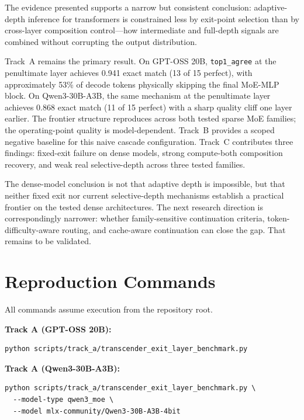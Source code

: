 \documentclass[11pt]{article}
\begin{document}
The evidence presented supports a narrow but consistent conclusion: adaptive-depth inference for transformers is constrained less by exit-point selection than by cross-layer composition control---how intermediate and full-depth signals are combined without corrupting the output distribution.

Track~A remains the primary result. On GPT-OSS 20B, \texttt{top1\_agree} at the penultimate layer achieves 0.941 exact match (13 of 15 perfect), with approximately 53\% of decode tokens physically skipping the final MoE-MLP block. On Qwen3-30B-A3B, the same mechanism at the penultimate layer achieves 0.868 exact match (11 of 15 perfect) with a sharp quality cliff one layer earlier. The frontier structure reproduces across both tested sparse MoE families; the operating-point quality is model-dependent. Track~B provides a scoped negative baseline for this naive cascade configuration. Track~C contributes three findings: fixed-exit failure on dense models, strong compute-both composition recovery, and weak real selective-depth across three tested families.

The dense-model conclusion is not that adaptive depth is impossible, but that neither fixed exit nor current selective-depth mechanisms establish a practical frontier on the tested dense architectures. The next research direction is correspondingly narrower: whether family-sensitive continuation criteria, token-difficulty-aware routing, and cache-aware continuation can close the gap. That remains to be validated.

\appendix

\section{Reproduction Commands}
\label{app:repro}

\noindent All commands assume execution from the repository root.

\smallskip
\noindent\textbf{Track A (GPT-OSS 20B):}
{\small
\begin{verbatim}
python scripts/track_a/transcender_exit_layer_benchmark.py
\end{verbatim}
}

\noindent\textbf{Track A (Qwen3-30B-A3B):}
{\small
\begin{verbatim}
python scripts/track_a/transcender_exit_layer_benchmark.py \
  --model-type qwen3_moe \
  --model mlx-community/Qwen3-30B-A3B-4bit
\end{verbatim}
}
\end{document}
